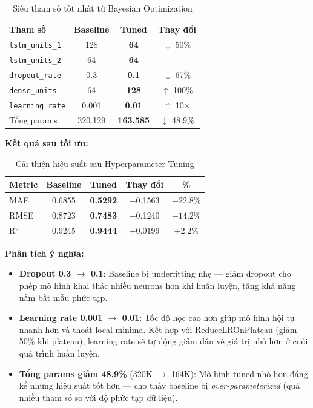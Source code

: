 \begin{table}[H]
\centering
\caption{Siêu tham số tốt nhất từ Bayesian Optimization}
\label{tab:best_hp}
\begin{tabular}{|l|c|c|c|}
\hline
\textbf{Tham số} & \textbf{Baseline} & \textbf{Tuned} & \textbf{Thay đổi} \\
\hline
\texttt{lstm\_units\_1}  & 128   & \textbf{64}    & $\downarrow$ 50\% \\
\texttt{lstm\_units\_2}  & 64    & \textbf{64}    & -- \\
\texttt{dropout\_rate}   & 0.3   & \textbf{0.1}   & $\downarrow$ 67\% \\
\texttt{dense\_units}    & 64    & \textbf{128}   & $\uparrow$ 100\% \\
\texttt{learning\_rate}  & 0.001 & \textbf{0.01}  & $\uparrow$ 10$\times$ \\
\hline
Tổng params              & 320.129 & \textbf{163.585} & $\downarrow$ 48.9\% \\
\hline
\end{tabular}
\end{table}

\textbf{Kết quả sau tối ưu:}

\begin{table}[H]
\centering
\caption{Cải thiện hiệu suất sau Hyperparameter Tuning}
\label{tab:tuning_improvement}
\begin{tabular}{|l|c|c|c|c|}
\hline
\textbf{Metric} & \textbf{Baseline} & \textbf{Tuned} & \textbf{Thay đổi} & \textbf{\%} \\
\hline
MAE  & 0.6855 & \textbf{0.5292} & $-$0.1563 & $\mathbf{-22.8\%}$ \\
RMSE & 0.8723 & \textbf{0.7483} & $-$0.1240 & $\mathbf{-14.2\%}$ \\
R²   & 0.9245 & \textbf{0.9444} & $+$0.0199 & $\mathbf{+2.2\%}$ \\
\hline
\end{tabular}
\end{table}

\textbf{Phân tích ý nghĩa:}

\begin{itemize}
    \item \textbf{Dropout 0.3 $\to$ 0.1}: Baseline bị underfitting nhẹ — giảm dropout cho phép mô hình khai thác nhiều neurons hơn khi huấn luyện, tăng khả năng nắm bắt mẫu phức tạp.
    \item \textbf{Learning rate 0.001 $\to$ 0.01}: Tốc độ học cao hơn giúp mô hình hội tụ nhanh hơn và thoát local minima. Kết hợp với ReduceLROnPlateau (giảm 50\% khi plateau), learning rate sẽ tự động giảm dần về giá trị nhỏ hơn ở cuối quá trình huấn luyện.
    \item \textbf{Tổng params giảm 48.9\%} (320K $\to$ 164K): Mô hình tuned nhỏ hơn đáng kể nhưng hiệu suất tốt hơn — cho thấy baseline bị \textit{over-parameterized} (quá nhiều tham số so với độ phức tạp dữ liệu).
\end{itemize}

